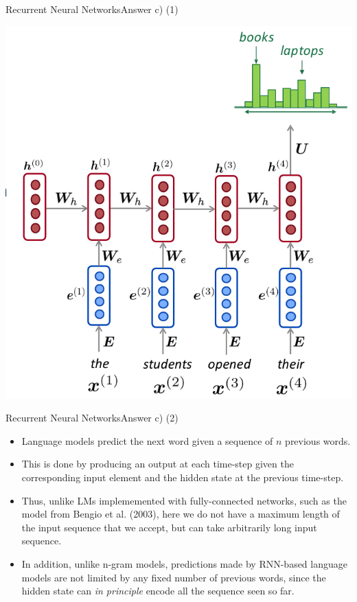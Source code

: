 \documentclass[t]{beamer}
\begin{document}
\begin{frame}{Recurrent Neural Networks}{Answer c) (1)}
    \begin{center}
        \includegraphics[scale=0.25]{img/lm_rnn_1.png}
    \end{center}
\end{frame}

\begin{frame}{Recurrent Neural Networks}{Answer c) (2)}
    \begin{itemize}
        \item Language models predict the next word given a sequence of $n$
              previous words.
        \item This is done by producing an output at each time-step given the
              corresponding input element and the hidden state at the previous
              time-step.
        \item Thus, unlike LMs implememented with fully-connected networks, such
              as the model from Bengio et al. (2003), here we do not have a
              maximum length of the input sequence that we accept, but can take
              arbitrarily long input sequence.
        \item In addition, unlike n-gram models, predictions made by RNN-based
              language models are not limited by any fixed number of previous
              words, since the hidden state can \emph{in principle} encode all
              the sequence seen so far.
    \end{itemize}
\end{frame}
\end{document}
